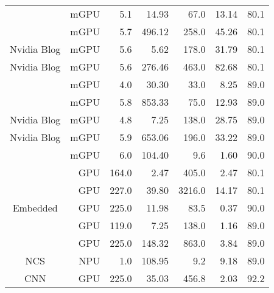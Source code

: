 \documentclass[%
	a4paper,
	twoside
]
{book}
\begin{document}
\begin{table}[ht]
\begin{tabular}{c|r|r|r|r|r|r}
\cite{Nvidia2015} & mGPU & 5.1 & 14.93 & 67.0 & 13.14 & 80.1 \\
\cite{Nvidia2015} & mGPU & 5.7 & 496.12 & 258.0 & 45.26 & 80.1 \\
Nvidia Blog & mGPU & 5.6 & 5.62 & 178.0 & 31.79 & 80.1 \\
Nvidia Blog & mGPU & 5.6 & 276.46 & 463.0 & 82.68 & 80.1 \\
\cite{Nvidia2015} & mGPU & 4.0 & 30.30 & 33.0 & 8.25 & 89.0 \\
\cite{Nvidia2015} & mGPU & 5.8 & 853.33 & 75.0 & 12.93 & 89.0 \\
Nvidia Blog & mGPU & 4.8 & 7.25 & 138.0 & 28.75 & 89.0 \\
Nvidia Blog & mGPU & 5.9 & 653.06 & 196.0 & 33.22 & 89.0 \\
\cite{Nvidia2018} & mGPU & 6.0 & 104.40 & 9.6 & 1.60 & 90.0 \\
\cite{Nvidia2015} & GPU & 164.0 & 2.47 & 405.0 & 2.47 & 80.1 \\
\cite{Nvidia2015} & GPU & 227.0 & 39.80 & 3216.0 & 14.17 & 80.1 \\
Embedded& GPU & 225.0 & 11.98 & 83.5 & 0.37 & 90.0 \\
\cite{Nvidia2015} & GPU & 119.0 & 7.25 & 138.0 & 1.16 & 89.0 \\
\cite{Nvidia2015} & GPU & 225.0 & 148.32 & 863.0 & 3.84 & 89.0 \\
NCS & NPU & 1.0 & 108.95 & 9.2 & 9.18 & 89.0 \\
CNN  & GPU & 225.0 & 35.03 & 456.8 & 2.03 & 92.2 \\

\hline
\end{tabular}
\end{table}



%
\printbibliography
\end{document}
